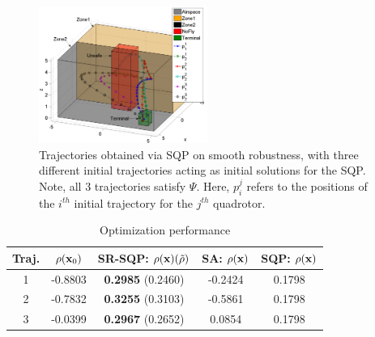 \begin{figure}[t]
\centering
\includegraphics[width=0.49\textwidth]{figures/QuadTrajs_scissored}
\caption{ Trajectories obtained via SQP on smooth robustness, with three different initial trajectories acting as initial solutions for the SQP. Note, all 3 trajectories satisfy $\Psi$. Here, $p_{i}^j$ refers to the positions of the $i^{th}$ initial trajectory for the $j^{th}$ quadrotor.}
\label{fig:quad_ssqp}
\end{figure}

{\small
\begin{table}[htb]
\begin{center}
\caption{Optimization performance}
\label{tbl:opt_performance}
\begin{tabular} {|c|c|c|c|c|}
	\hline
	\textbf{Traj.} & $\rho(\mathbf{x}_0) $ & SR-SQP: $\rho(\mathbf{x}) (\tilde{\rho})$ & SA: $\rho(\mathbf{x})$ & SQP: $\rho(\mathbf{x})$\\ \hline
	1 & -0.8803 & \textbf{0.2985} (0.2460) & -0.2424 & 0.1798 \\ \hline
	2 & -0.7832 & \textbf{0.3255} (0.3103) & -0.5861 & 0.1798 \\ \hline
	3 & -0.0399 & \textbf{0.2967} (0.2652) & 0.0854 & 0.1798 \\ \hline
\end{tabular}	
\end{center}
\end{table}
}



